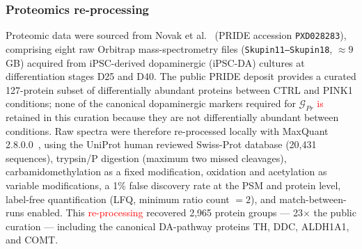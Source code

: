 \documentclass[5p,times,twocolumn]{elsarticle}
\newcommand{\lang}[1]{\textcolor{red}{#1}}
\begin{document}
\subsubsection{Proteomics re-processing}
Proteomic data were sourced from Novak et al.~\cite{novak2022single}
(PRIDE accession \texttt{PXD028283}), comprising eight raw
Orbitrap mass-spectrometry files (\texttt{Skupin11--Skupin18},
$\approx 9$\,GB) acquired from iPSC-derived dopaminergic
(iPSC-DA) cultures at differentiation stages D25 and D40.
The public PRIDE deposit provides a curated 127-protein subset
of differentially abundant proteins between CTRL and PINK1
conditions; none of the canonical dopaminergic markers required
for $\mathcal{G}_{Pr}$ \lang{is} retained in this curation because
they are not differentially abundant between conditions.
Raw spectra were therefore re-processed locally with
MaxQuant 2.8.0.0~\cite{cox2008maxquant}, using the UniProt
human reviewed Swiss-Prot database (20,431 sequences),
trypsin/P digestion (maximum two missed cleavages),
carbamidomethylation as a fixed modification, oxidation and
acetylation as variable modifications, a 1\% false discovery
rate at the PSM and protein level, label-free quantification
(LFQ, minimum ratio count $= 2$), and match-between-runs
enabled.
This \lang{re-processing} recovered 2,965 protein groups --- 23$\times$ the
public curation --- including the canonical DA-pathway
proteins TH, DDC, ALDH1A1, and COMT.
\end{document}
